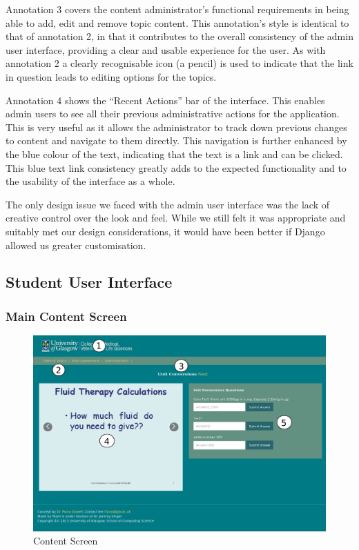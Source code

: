 \documentclass{l3proj}
\begin{document}
Annotation 3 covers the content administrator's functional requirements in being able to add, edit and remove topic content. This annotation's style is identical to that of annotation 2, in that it contributes to the overall consistency of the admin user interface, providing a clear and usable experience for the user. As with annotation 2 a clearly recognisable icon (a pencil) is used to indicate that the link in question leads to editing options for the topics. 

Annotation 4 shows the ``Recent Actions'' bar of the interface. This enables admin users to see all their previous administrative actions for the application. This is very useful as it allows the administrator to track down previous changes to content and navigate to them directly. This navigation is further enhanced by the blue colour of the text, indicating that the text is a link and can be clicked. This blue text link consistency greatly adds to the expected functionality and to the usability of the interface as a whole.

The only design issue we faced with the admin user interface was the lack of creative control over the look and feel. While we still felt it was appropriate and suitably met our design considerations, it would have been better if Django allowed us greater customisation.

\subsection{Student User Interface}

\subsubsection{Main Content Screen}

\begin{figure}[!htb]
\caption{Content Screen}
\includegraphics[width=\linewidth]{images/topic_page_annotated.png}
\end{figure}
\end{document}
